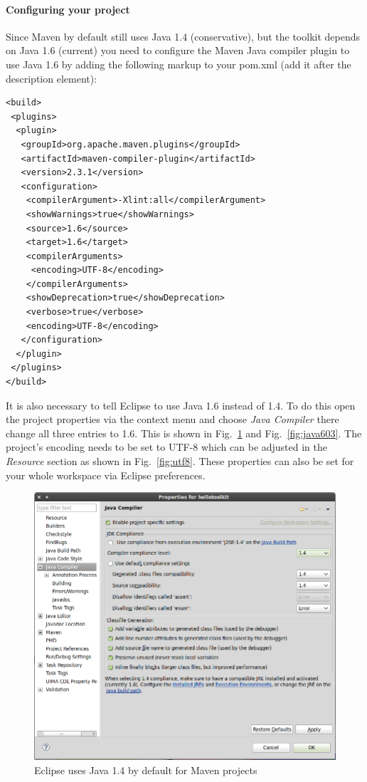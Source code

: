 \paragraph{Configuring your project} Since Maven by default still uses Java 1.4 (conservative), but the toolkit depends on Java 1.6 (current) you need to configure the Maven Java compiler plugin to use Java 1.6 by adding the following markup to your pom.xml (add it after the description element):
\begin{verbatim}
<build>
 <plugins>
  <plugin>
   <groupId>org.apache.maven.plugins</groupId>
   <artifactId>maven-compiler-plugin</artifactId>
   <version>2.3.1</version>
   <configuration>
    <compilerArgument>-Xlint:all</compilerArgument>
    <showWarnings>true</showWarnings>
    <source>1.6</source>
    <target>1.6</target>
    <compilerArguments>
     <encoding>UTF-8</encoding>
    </compilerArguments>
    <showDeprecation>true</showDeprecation>
    <verbose>true</verbose>
    <encoding>UTF-8</encoding>
   </configuration>
  </plugin>
 </plugins>
</build>
\end{verbatim}
It is also necessary to tell Eclipse to use Java 1.6 instead of 1.4. To do this open the project properties via the context menu and choose \textit{Java Compiler} there change all three entries to 1.6. This is shown in Fig.~\ref{fig:java602} and Fig.~\ref{fig:java603}. The project's encoding needs to be set to UTF-8 which can be adjusted in the \textit{Resource} section as shown in Fig.~\ref{fig:utf8}. These properties can also be set for your whole workspace via Eclipse preferences.
\begin{figure}
\centering
\includegraphics[width=\textwidth]{img/ht08.png}
\caption{Eclipse uses Java 1.4 by default for Maven projects}
\label{fig:java602}
\end{figure}
